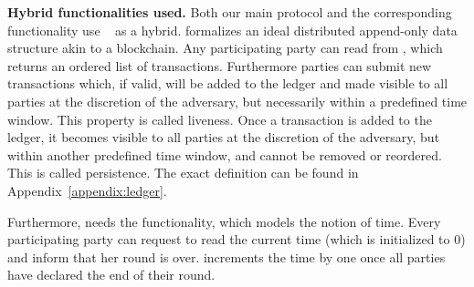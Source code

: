 
  \noindent \textbf{Hybrid functionalities used.}
    Both our main protocol and the corresponding functionality use
    \ledger~\cite{BMTZ17,genesis} as a hybrid. \ledger{} formalizes an ideal
    distributed append-only data structure akin to a blockchain. Any
    participating party can read from \ledger, which returns an ordered list
    of transactions. Furthermore parties can submit new transactions which, if
    valid, will be added to the ledger and made visible to all parties at the
    discretion of the adversary, but necessarily within a predefined time
    window. This property is called liveness. Once a transaction is added to the
    ledger, it becomes visible to all parties at the discretion of the
    adversary, but within another predefined time window, and cannot be removed
    or reordered. This is called persistence. The exact definition can be found
    in Appendix~\ref{appendix:ledger}.

    Furthermore, \ledger{} needs the \Fclock functionality, which models the
    notion of time. Every participating party can request to read the current
    time (which is initialized to 0) and inform \Fclock that her round is over.
    \Fclock increments the time by one once all parties have declared the end of
    their round.

